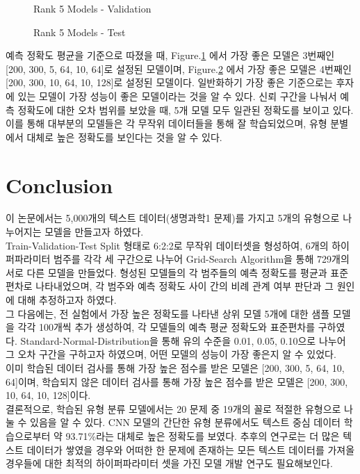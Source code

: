 \documentclass{jcse}
\begin{document}
\begin{figure}[ht]
	\centering
	\caption{Rank 5 Models - Validation}
	\label{fig:Rank 5 Models - Validation}
\end{figure}

\begin{figure}[ht]
	\centering
	\caption{Rank 5 Models - Test}
	\label{fig:Rank 5 Models - Test}
\end{figure}

예측 정확도 평균을 기준으로 따졌을 때, Figure.\ref{fig:Rank 5 Models - Validation} 에서 가장 좋은 모델은 3번째인 [200, 300, 5, 64, 10, 64]로 설정된 모델이며, Figure.\ref{fig:Rank 5 Models - Test} 에서 가장 좋은 모델은 4번째인 [200, 300, 10, 64, 10, 128]로 설정된 모델이다. 일반화하기 가장 좋은 기준으로는 후자에 있는 모델이 가장 성능이 좋은 모델이라는 것을 알 수 있다.
신뢰 구간을 나눠서 예측 정확도에 대한 오차 범위를 보았을 때, 5개 모델 모두 일관된 정확도를 보이고 있다. 이를 통해 대부분의 모델들은 각 무작위 데이터들을 통해 잘 학습되었으며, 유형 분별에서 대체로 높은 정확도를 보인다는 것을 알 수 있다.

\section{Conclusion}
이 논문에서는 5,000개의 텍스트 데이터(생명과학1 문제)를 가지고 5개의 유형으로 나누어지는 모델을 만들고자 하였다.
\\Train-Validation-Test Split 형태로 6:2:2로 무작위 데이터셋을 형성하여, 6개의 하이퍼파라미터 범주를 각각 세 구간으로 나누어 Grid-Search Algorithm을 통해 729개의 서로 다른 모델을 만들었다. 형성된 모델들의 각 범주들의 예측 정확도를 평균과 표준편차로 나타내었으며, 각 범주와 예측 정확도 사이 간의 비례 관계 여부 판단과 그 원인에 대해 추정하고자 하였다.
\\그 다음에는, 전 실험에서 가장 높은 정확도를 나타낸 상위 모델 5개에 대한 샘플 모델을 각각 100개씩 추가 생성하여, 각 모델들의 예측 평균 정확도와 표준편차를 구하였다. Standard-Normal-Distribution을 통해 유의 수준을 0.01, 0.05, 0.10으로 나누어 그 오차 구간을 구하고자 하였으며, 어떤 모델의 성능이 가장 좋은지 알 수 있었다.
\\이미 학습된 데이터 검사를 통해 가장 높은 점수를 받은 모델은 [200, 300, 5, 64, 10, 64]이며, 학습되지 않은 데이터 검사를 통해 가장 높은 점수를 받은 모델은 [200, 300, 10, 64, 10, 128]이다.
\\결론적으로, 학습된 유형 분류 모델에서는 20 문제 중 19개의 꼴로 적절한 유형으로 나눌 수 있음을 알 수 있다. CNN 모델의 간단한 유형 분류에서도 텍스트 중심 데이터 학습으로부터 약 93.71\%라는 대체로 높은 정확도를 보였다. 추후의 연구로는 더 많은 텍스트 데이터가 쌓였을 경우와 어떠한 한 문제에 존재하는 모든 텍스트 데이터를 가져올 경우들에 대한 최적의 하이퍼파라미터 셋을 가진 모델 개발 연구도 필요해보인다.





\end{document}
